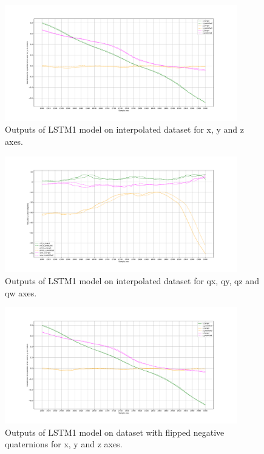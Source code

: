 
\begin{figure}
	\begin{center}
		\includegraphics[width=0.9\textwidth, keepaspectratio]{gfx/lstm1_interpolated-xyz_position.pdf}
		\caption{\label{fig:interp1} Outputs of LSTM1 model on interpolated dataset for x, y and z axes.}
	\end{center}
\end{figure}

\begin{figure}
	\begin{center}
		\includegraphics[width=0.9\textwidth, keepaspectratio]{gfx/lstm1_interpolated-roll_pitch_yaw.pdf}
		\caption{\label{fig:interp2} Outputs of LSTM1 model on interpolated dataset for qx, qy, qz and qw axes.}
	\end{center}
\end{figure}

\begin{figure}
	\begin{center}
		\includegraphics[width=0.9\textwidth, keepaspectratio]{gfx/lstm1_flipped-xyz_position.pdf}
		\caption{\label{fig:flip1} Outputs of LSTM1 model on dataset with flipped negative quaternions for x, y and z axes.}
	\end{center}
\end{figure}

